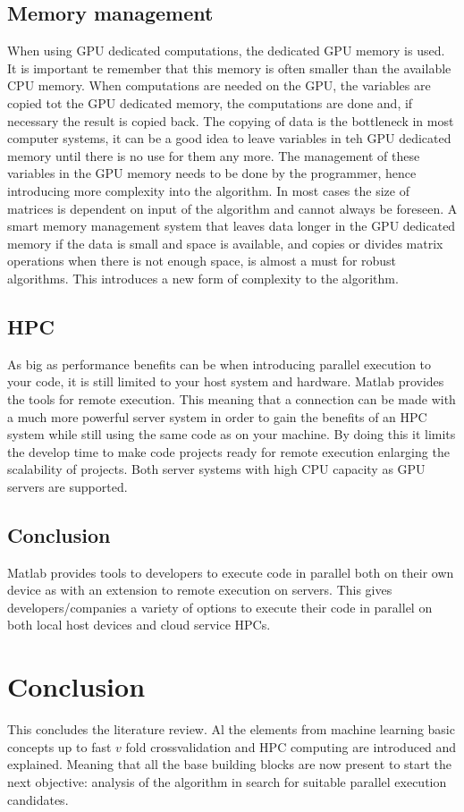 \subsection{Memory management}
When using GPU dedicated computations, the dedicated GPU memory is used. 
It is important te remember that this memory is often smaller than the available CPU memory.
When computations are needed on the GPU, the variables are copied tot the GPU dedicated memory, the computations are done and, if necessary the result is copied back.
The copying of data is the bottleneck in most computer systems, it can be a good idea to leave variables in teh GPU dedicated memory until there is no use for them any more.
The management of these variables in the GPU memory needs to be done by the programmer, hence introducing more complexity into the algorithm.
In most cases the size of matrices is dependent on input of the algorithm and cannot always be foreseen.
A smart memory management system that leaves data longer in the GPU dedicated memory if the data is small and space is available, and copies or divides matrix operations when there is not enough space, is almost a must for robust algorithms.
This introduces a new form of complexity to the algorithm.

\subsection{HPC}
As big as performance benefits can be when introducing parallel execution to your code, it is still limited to your host system and hardware.
Matlab provides the tools for remote execution.
This meaning that a connection can be made with a much more powerful server system in order to gain the benefits of an HPC system while still using the same code as on your machine.
By doing this it limits the develop time to make code projects ready for remote execution enlarging the scalability of projects.
Both server systems with high CPU capacity as GPU servers are supported. \cite{MATLABNV63:online}\cite{MATLABin13:online}

\subsection{Conclusion}
Matlab provides tools to developers to execute code in parallel both on their own device as with an extension to remote execution on servers.
This gives developers/companies a variety of options to execute their code in parallel on both local host devices and cloud service HPCs.


\section{Conclusion}
This concludes the literature review. 
Al the elements from machine learning basic concepts up to fast $v$ fold crossvalidation and HPC computing are introduced and explained.
Meaning that all the base building blocks are now present to start the next objective: analysis of the algorithm in search for suitable parallel execution candidates.


